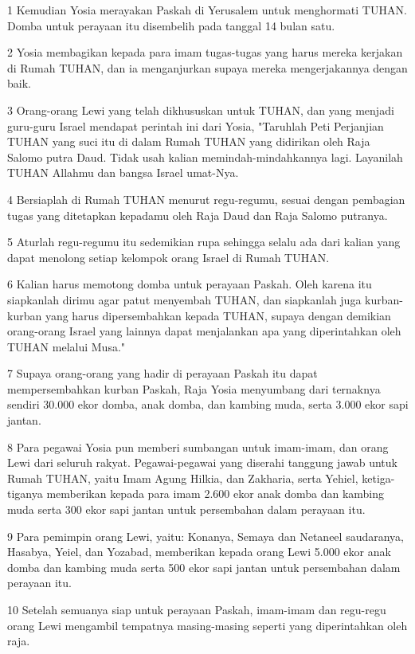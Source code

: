 \par 1 Kemudian Yosia merayakan Paskah di Yerusalem untuk menghormati TUHAN. Domba untuk perayaan itu disembelih pada tanggal 14 bulan satu.
\par 2 Yosia membagikan kepada para imam tugas-tugas yang harus mereka kerjakan di Rumah TUHAN, dan ia menganjurkan supaya mereka mengerjakannya dengan baik.
\par 3 Orang-orang Lewi yang telah dikhususkan untuk TUHAN, dan yang menjadi guru-guru Israel mendapat perintah ini dari Yosia, "Taruhlah Peti Perjanjian TUHAN yang suci itu di dalam Rumah TUHAN yang didirikan oleh Raja Salomo putra Daud. Tidak usah kalian memindah-mindahkannya lagi. Layanilah TUHAN Allahmu dan bangsa Israel umat-Nya.
\par 4 Bersiaplah di Rumah TUHAN menurut regu-regumu, sesuai dengan pembagian tugas yang ditetapkan kepadamu oleh Raja Daud dan Raja Salomo putranya.
\par 5 Aturlah regu-regumu itu sedemikian rupa sehingga selalu ada dari kalian yang dapat menolong setiap kelompok orang Israel di Rumah TUHAN.
\par 6 Kalian harus memotong domba untuk perayaan Paskah. Oleh karena itu siapkanlah dirimu agar patut menyembah TUHAN, dan siapkanlah juga kurban-kurban yang harus dipersembahkan kepada TUHAN, supaya dengan demikian orang-orang Israel yang lainnya dapat menjalankan apa yang diperintahkan oleh TUHAN melalui Musa."
\par 7 Supaya orang-orang yang hadir di perayaan Paskah itu dapat mempersembahkan kurban Paskah, Raja Yosia menyumbang dari ternaknya sendiri 30.000 ekor domba, anak domba, dan kambing muda, serta 3.000 ekor sapi jantan.
\par 8 Para pegawai Yosia pun memberi sumbangan untuk imam-imam, dan orang Lewi dari seluruh rakyat. Pegawai-pegawai yang diserahi tanggung jawab untuk Rumah TUHAN, yaitu Imam Agung Hilkia, dan Zakharia, serta Yehiel, ketiga-tiganya memberikan kepada para imam 2.600 ekor anak domba dan kambing muda serta 300 ekor sapi jantan untuk persembahan dalam perayaan itu.
\par 9 Para pemimpin orang Lewi, yaitu: Konanya, Semaya dan Netaneel saudaranya, Hasabya, Yeiel, dan Yozabad, memberikan kepada orang Lewi 5.000 ekor anak domba dan kambing muda serta 500 ekor sapi jantan untuk persembahan dalam perayaan itu.
\par 10 Setelah semuanya siap untuk perayaan Paskah, imam-imam dan regu-regu orang Lewi mengambil tempatnya masing-masing seperti yang diperintahkan oleh raja.
